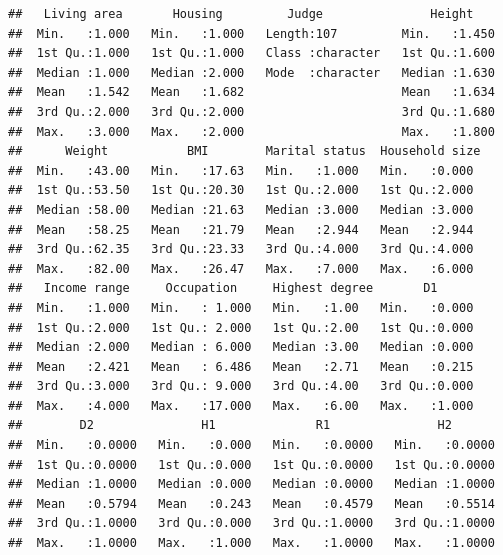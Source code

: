 \documentclass[
]{book}
\newenvironment{Shaded}{\begin{snugshade}}{\end{snugshade}}
\newcommand{\AttributeTok}[1]{\textcolor[rgb]{0.77,0.63,0.00}{#1}}
\newcommand{\DecValTok}[1]{\textcolor[rgb]{0.00,0.00,0.81}{#1}}
\newcommand{\FunctionTok}[1]{\textcolor[rgb]{0.00,0.00,0.00}{#1}}
\newcommand{\NormalTok}[1]{#1}
\newcommand{\OtherTok}[1]{\textcolor[rgb]{0.56,0.35,0.01}{#1}}
\newcommand{\SpecialCharTok}[1]{\textcolor[rgb]{0.00,0.00,0.00}{#1}}
\newcommand{\StringTok}[1]{\textcolor[rgb]{0.31,0.60,0.02}{#1}}
\begin{document}
\begin{Shaded}
\end{Shaded}

\begin{verbatim}
##   Living area       Housing         Judge               Height     
##  Min.   :1.000   Min.   :1.000   Length:107         Min.   :1.450  
##  1st Qu.:1.000   1st Qu.:1.000   Class :character   1st Qu.:1.600  
##  Median :1.000   Median :2.000   Mode  :character   Median :1.630  
##  Mean   :1.542   Mean   :1.682                      Mean   :1.634  
##  3rd Qu.:2.000   3rd Qu.:2.000                      3rd Qu.:1.680  
##  Max.   :3.000   Max.   :2.000                      Max.   :1.800  
##      Weight           BMI        Marital status  Household size 
##  Min.   :43.00   Min.   :17.63   Min.   :1.000   Min.   :0.000  
##  1st Qu.:53.50   1st Qu.:20.30   1st Qu.:2.000   1st Qu.:2.000  
##  Median :58.00   Median :21.63   Median :3.000   Median :3.000  
##  Mean   :58.25   Mean   :21.79   Mean   :2.944   Mean   :2.944  
##  3rd Qu.:62.35   3rd Qu.:23.33   3rd Qu.:4.000   3rd Qu.:4.000  
##  Max.   :82.00   Max.   :26.47   Max.   :7.000   Max.   :6.000  
##   Income range     Occupation     Highest degree       D1       
##  Min.   :1.000   Min.   : 1.000   Min.   :1.00   Min.   :0.000  
##  1st Qu.:2.000   1st Qu.: 2.000   1st Qu.:2.00   1st Qu.:0.000  
##  Median :2.000   Median : 6.000   Median :3.00   Median :0.000  
##  Mean   :2.421   Mean   : 6.486   Mean   :2.71   Mean   :0.215  
##  3rd Qu.:3.000   3rd Qu.: 9.000   3rd Qu.:4.00   3rd Qu.:0.000  
##  Max.   :4.000   Max.   :17.000   Max.   :6.00   Max.   :1.000  
##        D2               H1              R1               H2        
##  Min.   :0.0000   Min.   :0.000   Min.   :0.0000   Min.   :0.0000  
##  1st Qu.:0.0000   1st Qu.:0.000   1st Qu.:0.0000   1st Qu.:0.0000  
##  Median :1.0000   Median :0.000   Median :0.0000   Median :1.0000  
##  Mean   :0.5794   Mean   :0.243   Mean   :0.4579   Mean   :0.5514  
##  3rd Qu.:1.0000   3rd Qu.:0.000   3rd Qu.:1.0000   3rd Qu.:1.0000  
##  Max.   :1.0000   Max.   :1.000   Max.   :1.0000   Max.   :1.0000  

\end{verbatim}
\end{document}
